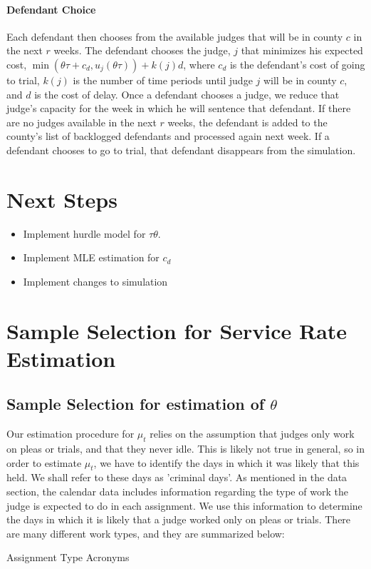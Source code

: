 \documentclass[11pt]{article}
\theoremstyle{ModifiedStyle}
\theoremstyle{ModifiedStyle}
\begin{document}
  \paragraph{Defendant Choice} Each defendant then chooses from the available judges that will be in
  county $c$ in the next $r$ weeks. The defendant chooses the judge, $j$ that minimizes his expected cost, $\min(\theta \tau + c_d,u_j(\theta \tau)) + k(j)d$, where $c_d$ is the defendant's cost of going to trial, $k(j)$ is the number of time periods until judge $j$ will be in county $c$, and $d$ is the cost of delay. Once a defendant chooses a judge, we reduce that judge's capacity for the week in which he will sentence that defendant. If there are no judges available in the next $r$ weeks, the defendant is added to the county's list of backlogged defendants and processed again next week. If a defendant chooses to go to trial, that defendant disappears from the simulation.

\section{Next Steps}
  \begin{itemize}
    \item Implement hurdle model for $\tau \theta$.
    \item Implement MLE estimation for $c_d$
    \item Implement changes to simulation
  \end{itemize}

 \printbibliography

\appendix
\section{Sample Selection for Service Rate Estimation}
  \subsection{Sample Selection for estimation of $\theta$}
    Our estimation procedure for $\mu_t$ relies on the assumption that judges only work on pleas or trials, and that they never idle. This is likely not true in general, so in order to estimate $\mu_t$, we have to identify the days in which it was likely that this held. We shall refer to these days as 'criminal days'. As mentioned in the data section, the calendar data includes information regarding the type of work the judge is expected to do in each assignment. We use this information to determine the days in which it is likely that a judge worked only on pleas or trials.
    There are many different work types, and they are summarized below:
    \begin{table}[H]
      \centering
      \caption{Assignment Type Acronyms}
      
    \end{table}
\end{document}
